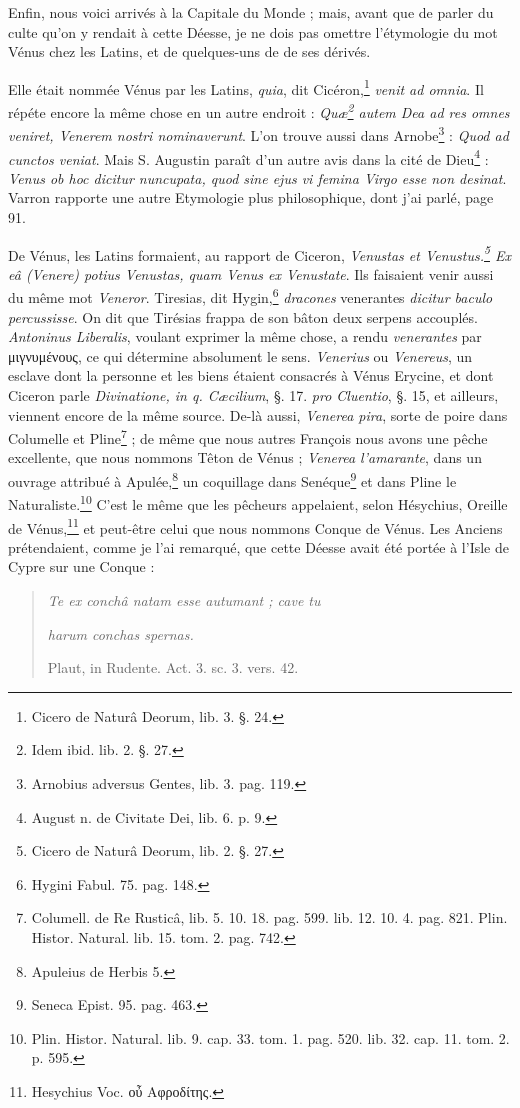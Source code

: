 \documentclass[a4paper, 11pt, oneside, polutonikogreek, french]{article}
\begin{document}
Enfin, nous voici arrivés à la Capitale du Monde ; mais, avant que de parler du culte qu'on y rendait à cette Déesse, je ne dois pas omettre l'étymologie du mot Vénus chez les Latins, et de quelques-uns de de ses dérivés.

Elle était nommée Vénus par les Latins, \emph{quia}, dit Cicéron,\footnote{Cicero de Naturâ Deorum, lib. 3. §. 24.} \emph{venit ad omnia}. Il répéte encore la même chose en un autre endroit : \emph{Quæ\footnote{Idem ibid. lib. 2. §. 27.} autem Dea ad res omnes veniret, Venerem nostri nominaverunt}. L'on trouve aussi dans Arnobe\footnote{Arnobius adversus Gentes, lib. 3. pag. 119.} : \emph{Quod ad cunctos veniat}. Mais S. Augustin paraît d'un autre avis dans la cité de Dieu\footnote{August n. de Civitate Dei, lib. 6. p. 9.} : \emph{Venus ob hoc dicitur nuncupata, quod sine ejus vi femina Virgo esse non desinat}. Varron rapporte une autre Etymologie plus philosophique, dont j'ai parlé, page 91.

De Vénus, les Latins formaient, au rapport de Ciceron, \emph{Venustas et Venustus.\footnote{Cicero de Naturâ Deorum, lib. 2. §. 27.} Ex eâ (Venere) potius Venustas, quam Venus ex Venustate}. Ils faisaient venir aussi du même mot \emph{Veneror}. Tiresias, dit Hygin,\footnote{Hygini Fabul. 75. pag. 148.} \emph{dracones} venerantes \emph{dicitur baculo percussisse}. On dit que Tirésias frappa de son bâton deux serpens accouplés. \emph{Antoninus Liberalis}, voulant exprimer la même chose, a rendu \emph{venerantes} par μιγνυμένους, ce qui détermine absolument le sens. \emph{Venerius} ou \emph{Venereus}, un esclave dont la personne et les biens étaient consacrés à Vénus Erycine, et dont Ciceron parle \emph{Divinatione, in q. Cæcilium}, §. 17. \emph{pro Cluentio}, §. 15, et ailleurs, viennent encore de la même source. De-là aussi, \emph{Venerea pira}, sorte de poire dans Columelle et Pline\footnote{Columell. de Re Rusticâ, lib. 5. 10. 18. pag. 599. lib. 12. 10. 4. pag. 821. Plin. Histor. Natural. lib. 15. tom. 2. pag. 742.} ; de même que nous autres François nous avons une pêche excellente, que nous nommons Têton de Vénus ; \emph{Venerea l'amarante}, dans un ouvrage attribué à Apulée,\footnote{Apuleius de Herbis 5.} un coquillage dans Senéque\footnote{Seneca Epist. 95. pag. 463.} et dans Pline le Naturaliste.\footnote{Plin. Histor. Natural. lib. 9. cap. 33. tom. 1. pag. 520. lib. 32. cap. 11. tom. 2. p. 595.} C'est le même que les pêcheurs appelaient, selon Hésychius, Oreille de Vénus,\footnote{Hesychius Voc. οὖ Αφροδίτης.} et peut-être celui que nous nommons Conque de Vénus. Les Anciens prétendaient, comme je l'ai remarqué, que cette Déesse avait été portée à l'Isle de Cypre sur une Conque :
\begin{quotation}
\emph{Te ex conchâ natam esse autumant ; cave tu}

\hspace*{5mm}\emph{harum conchas spernas.}

\hspace*{30mm}Plaut, in Rudente. Act. 3. sc. 3. vers. 42.
\end{quotation}
\end{document}
